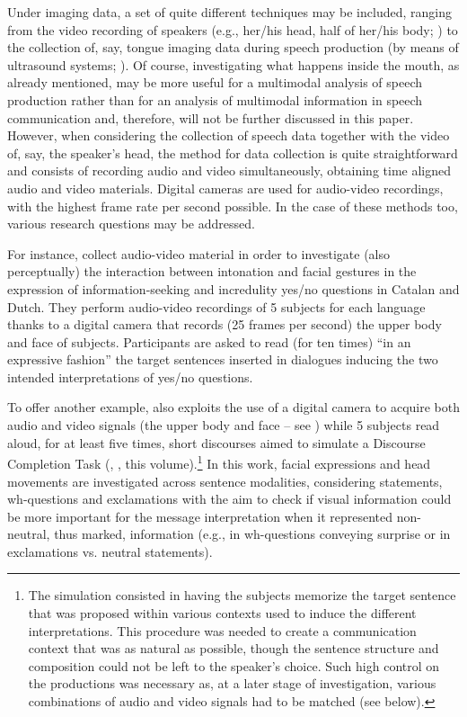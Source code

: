 \documentclass[output=paper]{langsci/langscibook}
\begin{document}
Under imaging data, a set of quite different techniques may be included, ranging from the video recording of speakers (e.g., her\slash his head, half of her\slash his body; \citealt{Ekman1978}) to the collection of, say, tongue imaging data during speech production (by means of ultrasound systems; \citealt{Stone2005}). Of course, investigating what happens inside the mouth, as already mentioned, may be more useful for a multimodal analysis of speech production rather than for an analysis of multimodal information in speech communication and, therefore, will not be further discussed in this paper. However, when considering the collection of speech data together with the video of, say, the speaker’s head, the method for data collection is quite straightforward and consists of recording audio and video simultaneously, obtaining time aligned audio and video materials. Digital cameras are used for audio-video recordings, with the highest frame rate per second possible. In the case of these methods too, various research questions may be addressed. 
 

For instance, \citet{CrespoSendra2013} collect audio-video material in order to investigate (also perceptually) the interaction between intonation and facial gestures in the expression of  information-seeking and incredulity yes\slash no questions in Catalan and Dutch. They perform audio-video recordings of 5 subjects for each language thanks to a digital camera that records (25 frames per second) the upper body and face of subjects. Participants are asked to read (for ten times) “in an expressive fashion” the target sentences inserted in dialogues inducing the two intended interpretations of yes\slash no questions.

To offer another example, \citet{GiliFivela2015informazionimultimodali} also exploits the use of a digital camera to acquire both audio and video signals (the upper body and face – see ) while 5 subjects read aloud, for at least five times, short discourses aimed to simulate a {Discourse Completion Task} (\citealt{BlumKulka1989}, \citeauthor{Vanrell.2018}, this volume).\footnote{The simulation consisted in having the subjects memorize the target sentence that was proposed within various  contexts used to induce the different interpretations. This procedure was needed to create a communication context that was as natural as possible, though the sentence structure and composition could not be left to the speaker’s choice. Such high control on the productions was necessary as, at a later stage of investigation, various combinations of audio and video signals had to be matched  (see below).} In this work, facial expressions and head movements are investigated across sentence modalities, considering statements, wh-questions and exclamations with the aim to check if visual information could be more important for the message interpretation when it represented non-neutral, thus marked, information (e.g., in wh-questions conveying surprise or in exclamations vs. neutral statements).
\end{document}
